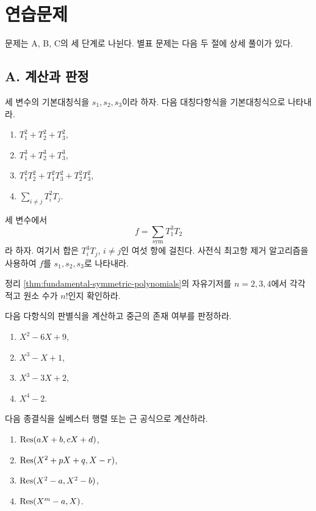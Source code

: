 \section{연습문제}
\label{sec:symmetric-discriminant-exercises}

문제는 A, B, C의 세 단계로 나뉜다. 별표 문제는 다음 두 절에 상세 풀이가 있다.

\subsection*{A. 계산과 판정}

\begin{exercise}[*]
세 변수의 기본대칭식을 $s_1,s_2,s_3$이라 하자. 다음 대칭다항식을 기본대칭식으로 나타내라.
\begin{enumerate}[label=(\alph*)]
  \item $T_1^2+T_2^2+T_3^2$,
  \item $T_1^3+T_2^3+T_3^3$,
  \item $T_1^2T_2^2+T_1^2T_3^2+T_2^2T_3^2$,
  \item $\sum_{i\ne j}T_i^2T_j$.
\end{enumerate}
\end{exercise}

\begin{exercise}
세 변수에서
\[
  f=\sum_{\mathrm{sym}}T_1^3T_2
\]
라 하자. 여기서 합은 $T_i^3T_j$, $i\ne j$인 여섯 항에 걸친다. 사전식 최고항 제거 알고리즘을 사용하여 $f$를 $s_1,s_2,s_3$로 나타내라.
\end{exercise}

\begin{exercise}
정리 \ref{thm:fundamental-symmetric-polynomials}의 자유기저를 $n=2,3,4$에서 각각 적고 원소 수가 $n!$인지 확인하라.
\end{exercise}

\begin{exercise}[*]
다음 다항식의 판별식을 계산하고 중근의 존재 여부를 판정하라.
\begin{enumerate}[label=(\alph*)]
  \item $X^2-6X+9$,
  \item $X^3-X+1$,
  \item $X^3-3X+2$,
  \item $X^4-2$.
\end{enumerate}
\end{exercise}

\begin{exercise}[*]
다음 종결식을 실베스터 행렬 또는 근 공식으로 계산하라.
\begin{enumerate}[label=(\alph*)]
  \item $\operatorname{Res}(aX+b,cX+d)$,
  \item $\operatorname{Res}(X^2+pX+q,X-r)$,
  \item $\operatorname{Res}(X^2-a,X^2-b)$,
  \item $\operatorname{Res}(X^m-a,X)$.
\end{enumerate}
\end{exercise}

